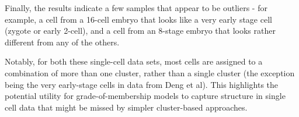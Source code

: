Finally, the results indicate a few samples that appear to be outliers - for example, a cell from a 16-cell embryo that looks like a very early stage cell (zygote or early 2-cell), and a cell from an 8-stage embryo that looks rather different from any of the others.

Notably, for both these single-cell data sets, most cells are assigned to a combination of more than one cluster, rather than a single cluster (the exception being the very early-stage cells in data from Deng et al). This highlights the potential utility for grade-of-membership models to capture structure in single cell data that might be missed by simpler cluster-based approaches.





 








